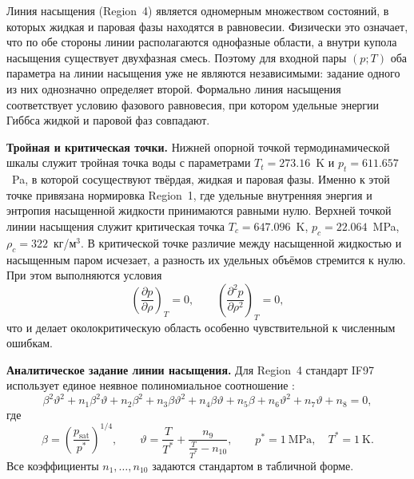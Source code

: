 Линия насыщения (Region~4) является одномерным множеством состояний,
в которых жидкая и паровая фазы находятся в равновесии.
Физически это означает,
что по обе стороны линии располагаются однофазные области,
а внутри купола насыщения существует двухфазная смесь.
Поэтому для входной пары $(p; T)$
оба параметра на линии насыщения уже не являются независимыми:
задание одного из них однозначно определяет второй.
Формально линия насыщения соответствует условию фазового равновесия,
при котором удельные энергии Гиббса жидкой и паровой фаз совпадают.

\noindent\textbf{Тройная и критическая точки.}
Нижней опорной точкой термодинамической шкалы
служит тройная точка воды
с параметрами $T_{t}=273.16$~K и $p_{t}=611.657$~Pa,
в которой сосуществуют твёрдая, жидкая и паровая фазы.
Именно к этой точке привязана нормировка Region~1,
где удельные внутренняя энергия и энтропия
насыщенной жидкости принимаются равными нулю.
Верхней точкой линии насыщения
служит критическая точка
$T_{c}=647.096$~K,
$p_{c}=22.064$~MPa,
$\rho_{c}=322$~кг/м$^{3}$.
В критической точке различие между насыщенной жидкостью
и насыщенным паром исчезает,
а разность их удельных объёмов стремится к нулю.
При этом выполняются условия
\begin{equation}
\left(\frac{\partial p}{\partial \rho}\right)_{T} = 0,
\qquad
\left(\frac{\partial^{2} p}{\partial \rho^{2}}\right)_{T} = 0,
\end{equation}
что и делает околокритическую область
особенно чувствительной к численным ошибкам.

\noindent\textbf{Аналитическое задание линии насыщения.}
Для Region~4 стандарт IF97 использует единое неявное полиномиальное соотношение
\cite{iapws_if97_2012}:
\begin{equation}
\beta^{2}\vartheta^{2}
+ n_{1}\beta^{2}\vartheta
+ n_{2}\beta^{2}
+ n_{3}\beta\vartheta^{2}
+ n_{4}\beta\vartheta
+ n_{5}\beta
+ n_{6}\vartheta^{2}
+ n_{7}\vartheta
+ n_{8}
= 0,
\end{equation}
где
\begin{equation}
\beta = \left(\frac{p_{\mathrm{sat}}}{p^{*}}\right)^{1/4},
\qquad
\vartheta = \frac{T}{T^{*}} + \frac{n_{9}}{\frac{T}{T^{*}} - n_{10}},
\qquad
p^{*}=1~\mathrm{MPa}, \quad T^{*}=1~\mathrm{K}.
\end{equation}
Все коэффициенты $n_{1},\dots,n_{10}$
задаются стандартом в табличной форме.

